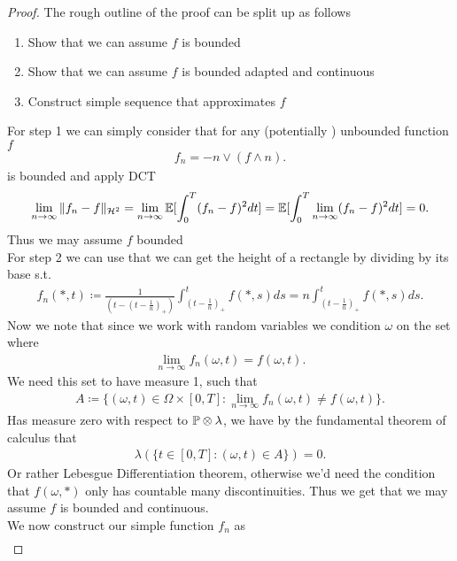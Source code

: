 \begin{proof}
 The rough outline of the proof can be split up as follows
 \begin{enumerate}
  \item Show that we can assume $f$ is bounded 
  \item Show that we can assume $f$ is bounded adapted and continuous
  \item Construct simple sequence that approximates $f$
 \end{enumerate}
 For step 1 we can simply consider that for any (potentially ) unbounded function $f$ 
 \begin{align*}
  f_n = -n \lor (f \land n)
 .\end{align*}
 is bounded and apply DCT
 \begin{align*}
   \lim_{n\to \infty}\|f_n - f\|_{\mathcal{H}^2} = \lim_{n\to \infty}\E[\int_0^{T}(f_n-f)^2 dt ] =  \E[\int_0^{T} \lim_{n \to \infty}(f_n-f)^2 dt ] = 0
 .\end{align*}
 Thus we may assume $f$ bounded \\[1ex]
 For step 2 we can use that we can get the height of a rectangle by dividing by its base s.t.
 \begin{align*}
   f_n(*,t) \coloneqq  \frac{1}{(t-(t-\frac{1}{n})_+)} \int_{(t-\frac{1}{n})_+}^{t} f(*,s) ds =  n \int_{(t-\frac{1}{n})_+}^{t} f(*,s) ds
 .\end{align*}
 Now we note that since we work with random variables we condition $\omega $ on the set where
 \begin{align*}
   \lim_{n\to \infty}  f_n(\omega ,t) = f(\omega ,t)
 .\end{align*}
 We need this set to have measure 1, such that 
 \begin{align*}
   A \coloneqq  \{(\omega ,t) \in  \Omega  \times  [0,T] : \lim_{n\to \infty} f_n(\omega ,t) \neq  f(\omega ,t)\}  
 .\end{align*}
 Has measure zero with respect to $\P \otimes \lambda $, we have by the fundamental theorem of calculus that
 \begin{align*}
   \lambda(\{t \in  [0,T] : (\omega,t) \in  A\}) = 0
 .\end{align*}
Or rather Lebesgue Differentiation theorem, otherwise we'd need the condition that $f(\omega ,*)$ only has countable many discontinuities.
Thus we get that we may assume $f$ is bounded and continuous.\\[1ex]
We now construct our simple function $f_n$ as 
\begin{align*}

\end{align*}
\end{proof}
